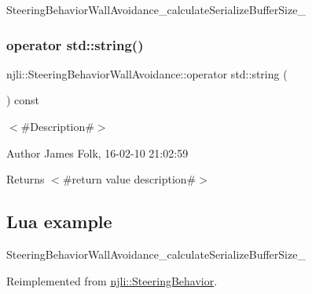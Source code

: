 \begin{DoxyCodeInclude}
\end{DoxyCodeInclude}
Steering\+Behavior\+Wall\+Avoidance\+\_\+calculate\+Serialize\+Buffer\+Size\+\_\+ \mbox{\label{classnjli_1_1_steering_behavior_wall_avoidance_aca10b42d39af7c023f2ff45ec6d93891}} 
\subsubsection{\texorpdfstring{operator std\+::string()}{operator std::string()}}
{\footnotesize\ttfamily njli\+::\+Steering\+Behavior\+Wall\+Avoidance\+::operator std\+::string (\begin{DoxyParamCaption}{ }\end{DoxyParamCaption}) const\hspace{0.3cm}{\ttfamily [virtual]}}



$<$\#\+Description\#$>$ 

\begin{DoxyAuthor}{Author}
James Folk, 16-\/02-\/10 21\+:02\+:59
\end{DoxyAuthor}
\begin{DoxyReturn}{Returns}
$<$\#return value description\#$>$
\end{DoxyReturn}
\hypertarget{classnjli_1_1_steering_behavior_wander_ex1}{}\subsection{Lua example}\label{classnjli_1_1_steering_behavior_wander_ex1}

\begin{DoxyCodeInclude}
\end{DoxyCodeInclude}
Steering\+Behavior\+Wall\+Avoidance\+\_\+calculate\+Serialize\+Buffer\+Size\+\_\+ 

Reimplemented from \mbox{\hyperlink{classnjli_1_1_steering_behavior_acd7af46e42a8a3fc1208a47f50836ac8}{njli\+::\+Steering\+Behavior}}.

\mbox{\label{classnjli_1_1_steering_behavior_wall_avoidance_ab6800def5ef3a2c5c560e0bb535116f6}} 
